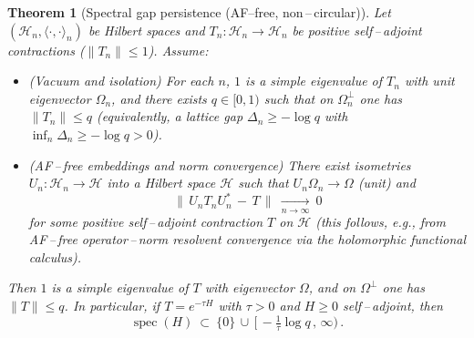 \documentclass[11pt]{amsart}
\theoremstyle{plain}
\newtheorem{theorem}{Theorem}[section]
\theoremstyle{definition}
\theoremstyle{remark}
\begin{document}
\begin{theorem}[Spectral gap persistence (AF--free, non\,–\,circular)]\label{thm:gap-persist-cont}
Let $(\mathcal H_n,\langle\cdot,\cdot\rangle_n)$ be Hilbert spaces and $T_n:\mathcal H_n\to\mathcal H_n$ be positive self\,–\,adjoint contractions ($\|T_n\|\le 1$). Assume:
\begin{itemize}
  \item[(i)] (Vacuum and isolation) For each $n$, $1$ is a simple eigenvalue of $T_n$ with unit eigenvector $\Omega_n$, and there exists $q\in[0,1)$ such that on $\Omega_n^{\perp}$ one has $\|T_n\|\le q$ (equivalently, a lattice gap $\Delta_n\ge -\log q$ with $\inf_n\Delta_n\ge -\log q>0$).
  \item[(ii)] (AF\,–\,free embeddings and norm convergence) There exist isometries $U_n:\mathcal H_n\to\mathcal H$ into a Hilbert space $\mathcal H$ such that $U_n\Omega_n\to\Omega$ (unit) and
  \[
    \big\|\,U_n T_n U_n^*\,-\,T\,\big\|\ \xrightarrow[n\to\infty]{}\ 0
  \]
  for some positive self\,–\,adjoint contraction $T$ on $\mathcal H$ (this follows, e.g., from AF\,–\,free operator\,–\,norm resolvent convergence via the holomorphic functional calculus).
\end{itemize}
Then $1$ is a simple eigenvalue of $T$ with eigenvector $\Omega$, and on $\Omega^{\perp}$ one has $\|T\|\le q$. In particular, if $T=e^{-\tau H}$ with $\tau>0$ and $H\ge 0$ self\,–\,adjoint, then
\[
  \operatorname{spec}(H)\ \subset\ \{0\}\,\cup\,\big[\,-\tfrac{1}{\tau}\log q\,,\,\infty\big)\,.
\]
\end{theorem}
\end{document}

